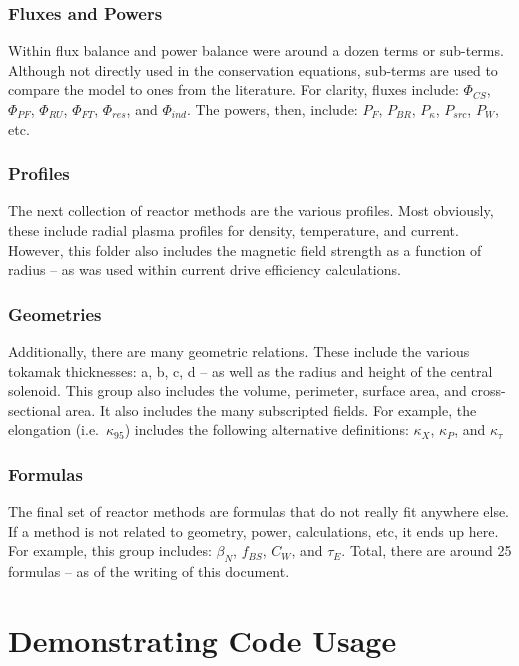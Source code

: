 \subsubsection{Fluxes and Powers}

Within flux balance and power balance were around a dozen terms or sub-terms. Although not directly used in the conservation equations, sub-terms are used to compare the model to ones from the literature. For clarity, fluxes include: $\Phi_{CS}$, $\Phi_{PF}$, $\Phi_{RU}$, $\Phi_{FT}$, $\Phi_{res}$, and $\Phi_{ind}$. The powers, then, include: $P_F$, $P_{BR}$, $P_\kappa$, $P_{src}$, $P_W$, etc.

\subsubsection{Profiles}

The next collection of reactor methods are the various profiles. Most obviously, these include radial plasma profiles for density, temperature, and current. However, this folder also includes the magnetic field strength as a function of radius -- as was used within current drive efficiency calculations.

\subsubsection{Geometries}

Additionally, there are many geometric relations. These include the various tokamak thicknesses: a, b, c, d -- as well as the radius and height of the central solenoid. This group also includes the volume, perimeter, surface area, and cross-sectional area. It also includes the many subscripted fields. For example, the elongation (i.e.\ $\kappa_{95}$) includes the following alternative definitions: $\kappa_X$, $\kappa_P$, and $\kappa_\tau$

\subsubsection{Formulas}

The final set of reactor methods are formulas that do not really fit anywhere else. If a method is not related to geometry, power, calculations, etc, it ends up here. For example, this group includes: $\beta_N$, $f_{BS}$, $C_W$, and $\tau_E$. Total, there are around 25 formulas -- as of the writing of this document.

\section{Demonstrating Code Usage}

